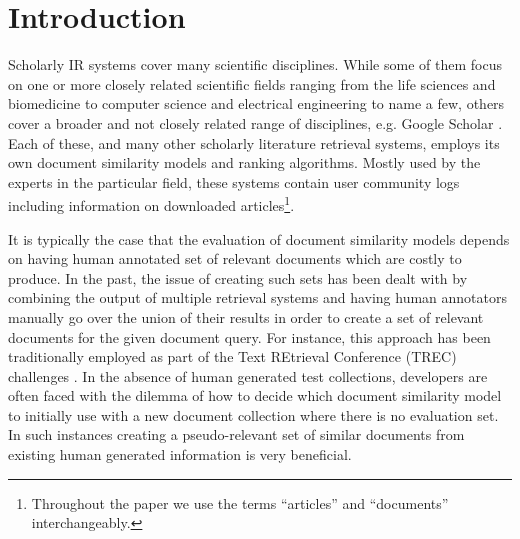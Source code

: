 \documentclass[letterpaper]{article}
\begin{document}
\section{Introduction}
Scholarly IR systems cover many scientific disciplines. While some of them focus on one or more closely related scientific fields ranging from the life sciences and biomedicine \cite{pubmed} to computer science \cite{acm} and electrical engineering \cite{ieee} to name a few, others cover a broader and not closely related range of disciplines, e.g. Google Scholar \cite{scholar.google.com}. Each of these, and many other scholarly literature retrieval systems, employs its own document similarity models and ranking algorithms. Mostly used by the experts in the particular field, these systems contain user community logs including information on downloaded articles\footnote{Throughout the paper we use the terms ``articles'' and ``documents'' interchangeably.}.

It is typically the case that the evaluation of document similarity models depends on having human annotated set of relevant documents which are costly to produce. In the past, the issue of creating such sets has been dealt with by combining the output of multiple retrieval systems and having human annotators manually go over the union of their results in order to create a set of relevant documents for the given document query. For instance, this approach has been traditionally employed as part of the Text REtrieval Conference (TREC) challenges \cite{Armstrong}. In the absence of human generated test collections, developers are often faced with the dilemma of how to decide which document similarity model to initially use with a new document collection where there is no evaluation set. In such instances creating a pseudo-relevant set of similar documents from existing human generated information is very beneficial. 
\end{document}
